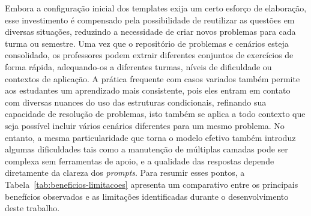 Embora a configuração inicial dos templates exija um certo esforço de elaboração, esse investimento é compensado pela possibilidade de reutilizar as questões em diversas situações, reduzindo a necessidade de criar novos problemas para cada turma ou semestre. Uma vez que o repositório de problemas e cenários esteja consolidado, os professores podem extrair diferentes conjuntos de exercícios de forma rápida, adequando-os a diferentes turmas, níveis de dificuldade ou contextos de aplicação. A prática frequente com casos variados também permite aos estudantes um aprendizado mais consistente, pois eles entram em contato com diversas nuances do uso das estruturas condicionais, refinando sua capacidade de resolução de problemas, isto também se aplica a todo contexto que seja possível incluir vários cenários diferentes para um mesmo problema. No entanto, a mesma particularidade que torna o modelo efetivo também introduz algumas dificuldades tais como a manutenção de múltiplas camadas pode ser complexa sem ferramentas de apoio, e a qualidade das respostas depende diretamente da clareza dos \emph{prompts}. Para resumir esses pontos, a Tabela~\ref{tab:beneficios-limitacoes} apresenta um comparativo entre os principais benefícios observados e as limitações identificadas durante o desenvolvimento deste trabalho.


